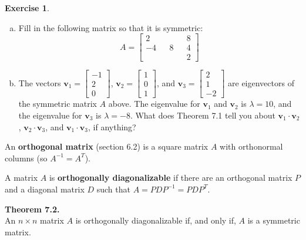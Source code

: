 \documentclass[10pt]{book}
\newcommand{\boxcolor}{gray!30}
\newenvironment{boxthm}{\begin{mdframed}[backgroundcolor=\boxcolor,nobreak=true]}{\end{mdframed}}
\newenvironment{boxdef}{\begin{mdframed}[backgroundcolor=\boxcolor,linewidth=0pt,nobreak=true]}{\end{mdframed}}
\theoremstyle{definition}
\newtheorem{exercise}{Exercise}[section]
\newcommand{\vect}[1]{\ensuremath{\boldsymbol{\mathbf{#1}}}}
\begin{document}
\begin{exercise} %
	\begin{enumerate}[(a)]
		\item Fill in the following matrix so that it is symmetric:
		\begingroup
		\renewcommand{\arraystretch}{1.5}
		$$ A = \begin{bmatrix}2&&  &&8\\-4&&8&&4\\ && &&2\end{bmatrix} $$
		\endgroup
		\item The vectors $\vect{v}_1=\begin{bmatrix}-1\\2\\0\end{bmatrix}$, $\vect{v}_2=\begin{bmatrix}1\\0\\1\end{bmatrix}$, and $\vect{v}_3=\begin{bmatrix}2\\1\\-2\end{bmatrix}$ are eigenvectors of the symmetric matrix $A$ above. The eigenvalue for $\vect{v}_1$ and $\vect{v}_2$ is $\lambda=10$, and the eigenvalue for $\vect{v}_3$ is $\lambda=-8$. What does Theorem 7.1 tell you about $\vect{v}_1\cdot\vect{v}_2$, $\vect{v}_2\cdot\vect{v}_3$, and $\vect{v}_1\cdot\vect{v}_3$, if anything?
	\end{enumerate}
\end{exercise}
\vspace{2in}


\begin{boxdef}
	An \textbf{orthogonal matrix} (section 6.2) is a square matrix $A$ with orthonormal columns (so $A^{-1}=A^T$). \par
	A matrix $A$ is \textbf{orthogonally diagonalizable} if there are an orthogonal matrix $P$ and a diagonal matrix $D$ such that $A=PDP^{-1}=PDP^T$.
\end{boxdef}
\vspace{-1em}
\begin{boxthm}
	\textbf{Theorem 7.2.} \\
	An $n\times n$ matrix $A$ is orthogonally diagonalizable if, and only if, $A$ is a symmetric matrix.
\end{boxthm}
\end{document}
